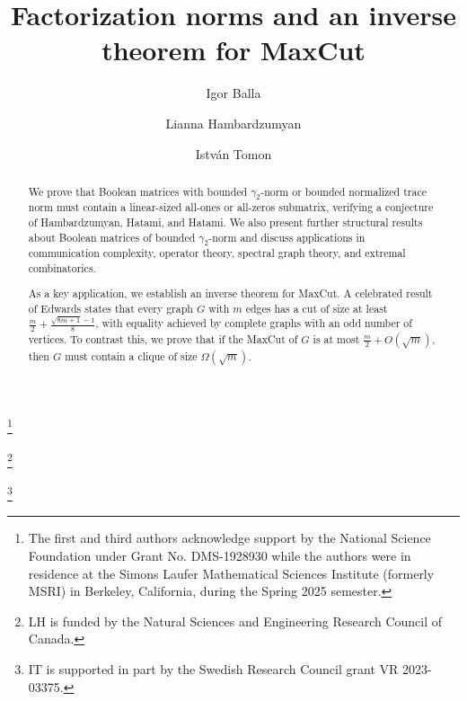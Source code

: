 \documentclass[11pt]{amsart}
\theoremstyle{plain}
\theoremstyle{definition}
\newcommand{\istvan}[1]{\textcolor{red}{it: #1}}
\newcommand{\lianna}[1]{\textcolor{blue}{lh: #1}}
\begin{document}

\title{Factorization norms and an inverse theorem for MaxCut}
    
\author{Igor Balla}
\address{Simons Laufer Mathematical Sciences Institute, 17 Gauss Way, Berkeley, CA 94720.}
\thanks{The first and third authors acknowledge support by the National Science Foundation under Grant No. DMS-1928930 while the authors were in residence at the Simons Laufer Mathematical Sciences Institute (formerly MSRI) in Berkeley, California, during the Spring 2025 semester.}

\author{Lianna Hambardzumyan}
\address{Department of Computer Science, University of Victoria, Victoria, BC V8P 5C2, Canada.}
\thanks{LH is funded by the Natural Sciences and Engineering Research Council of Canada.}
    
\author{Istv\'an Tomon}
\address{Department of Mathematics and Mathematical Statistics, Ume\r{a} University, Ume\r{a}, 90736, Sweden}
\thanks{IT is supported in part by the Swedish Research Council grant VR 2023-03375.}

\sloppy

\begin{abstract}
    We prove that Boolean matrices with bounded $\gamma_2$-norm or bounded normalized trace norm must contain a linear-sized all-ones or all-zeros submatrix, verifying a conjecture of Hambardzumyan, Hatami, and Hatami. We also present further structural results about Boolean matrices of bounded $\gamma_2$-norm and discuss applications in communication complexity, operator theory, spectral graph theory, and extremal combinatorics.

    As a key application, we establish an inverse theorem for MaxCut. A celebrated result of Edwards states that every graph $G$ with $m$ edges has a cut of size at least $\frac{m}{2}+\frac{\sqrt{8m+1}-1}{8}$, with equality achieved by complete graphs with an odd number of vertices. To contrast this, we prove that if the MaxCut of $G$ is at most $\frac{m}{2}+O(\sqrt{m})$, then $G$ must contain a clique of size $\Omega(\sqrt{m})$.
\end{abstract}
\end{document}
